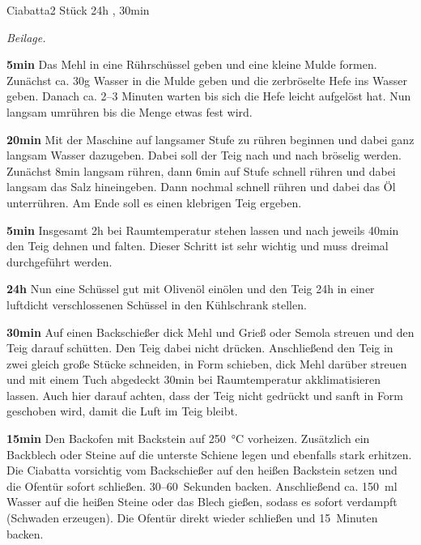 \documentclass[../recipe-collections/cooking.tex]{subfiles}
\begin{document}
\begin{recipe}{Ciabatta}{2 Stück }{24h , 30min }

  \freeform{}\textit{Beilage.}



  \textbf{5min}
  Das Mehl in eine Rührschüssel geben und eine kleine Mulde formen.
  Zunächst ca. 30g Wasser in die Mulde geben und die zerbröselte Hefe ins Wasser geben.
  Danach ca. 2–3 Minuten warten bis sich die Hefe leicht aufgelöst hat.
  Nun langsam umrühren bis die Menge etwas fest wird.


  \textbf{20min}
  Mit der Maschine auf langsamer Stufe zu rühren beginnen und dabei ganz langsam Wasser dazugeben.
  Dabei soll der Teig nach und nach bröselig werden.
  Zunächst 8min langsam rühren, dann 6min auf  Stufe schnell rühren und dabei langsam das Salz hineingeben.
  Dann nochmal schnell rühren und dabei das Öl unterrühren.
  Am Ende soll es einen klebrigen Teig ergeben.

  \newstep{}\textbf{5min}
  Insgesamt 2h bei Raumtemperatur stehen lassen und nach jeweils 40min den Teig dehnen und falten.
  Dieser Schritt ist sehr wichtig und muss dreimal durchgeführt werden.

  \newstep{}\textbf{24h}
  Nun eine Schüssel gut mit Olivenöl einölen und den Teig 24h in einer luftdicht verschlossenen Schüssel in den Kühlschrank stellen.

  \newstep{}\textbf{30min}
  Auf einen Backschießer dick Mehl und Grieß oder Semola streuen und den Teig darauf schütten.
  Den Teig dabei nicht drücken.
  Anschließend den Teig in zwei gleich große Stücke schneiden, in Form schieben, dick Mehl darüber streuen und mit einem Tuch abgedeckt 30min bei Raumtemperatur akklimatisieren lassen.
  Auch hier darauf achten, dass der Teig nicht gedrückt und sanft in Form geschoben wird, damit die Luft im Teig bleibt.

  \newstep{}\textbf{15min}
  Den Backofen mit Backstein auf 250~°C vorheizen.
  Zusätzlich ein Backblech oder Steine auf die unterste Schiene legen und ebenfalls stark erhitzen.
  Die Ciabatta vorsichtig vom Backschießer auf den heißen Backstein setzen und die Ofentür sofort schließen.
  30–60~Sekunden backen.
  Anschließend ca. 150~ml Wasser auf die heißen Steine oder das Blech gießen, sodass es sofort verdampft (Schwaden erzeugen).
  Die Ofentür direkt wieder schließen und 15~Minuten backen.


\end{recipe}
\end{document}
